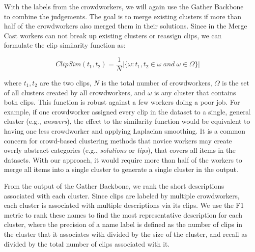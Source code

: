 With the labels from the crowdworkers,
we will again use the Gather Backbone to combine the judgements. The goal
is to merge existing clusters if more than half of the crowdworkers also
merged them in their solutions. Since in the Merge Cast
workers can not break up existing clusters or reassign clips, we can formulate 
the clip similarity function as:

\vspace{-2mm}
\begin{equation}
	ClipSim(t_1, t_2) = \frac{1}{N} |\{\omega: t_1, t_2 \in \omega \; and \; \omega \in \Omega\}|
\end{equation}
\vspace{-1mm}



where $t_1, t_2$ are the two clips, $N$ is the total number of crowdworkers,
$\Omega$ is the set of all clusters created by all crowdworkers, and $\omega$ is any cluster that contains both clips. This
function is robust against a few workers doing a
poor job. For example, if one crowdworker assigned every clip in the dataset to
a single, general cluster (e.g., \emph{answers}), the effect to the similarity function
would be equivalent to having one less crowdworker and applying Laplacian smoothing.
It is a common concern for crowd-based clustering methods
that novice workers may create overly abstract categories (e.g., \emph{solutions} or
\emph{tips}), that covers
all items in the datasets.
With our approach,
it would require more than half of the workers to merge all items into a single cluster
to generate a single cluster in the output.



From the output of the Gather Backbone, we rank the short descriptions
associated with each cluster.
Since clips are labeled by multiple crowdworkers, each cluster
is associated with multiple
descriptions via its clips. We use the F1 metric to rank these names to
find the most representative description for each cluster, where the precision
of a name label is defined as
the number of clips in the cluster that it associates with divided by the size of the cluster,
and recall as divided by the total number of clips associated with it.


